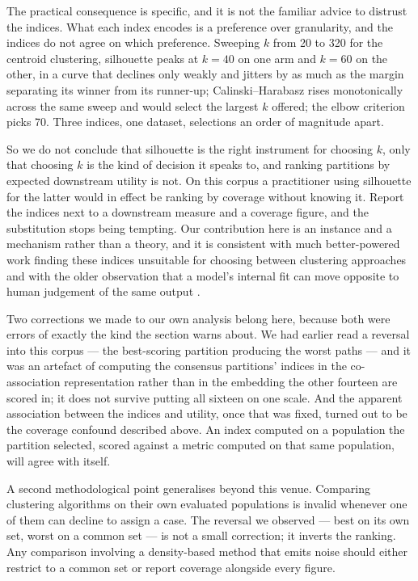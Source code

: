 The practical consequence is specific, and it is not the familiar advice to distrust the
indices. What each index encodes is a preference over granularity, and the indices do not agree
on which preference. Sweeping $k$ from 20 to 320 for the centroid clustering, silhouette peaks
at $k = 40$ on one arm and $k = 60$ on the other, in a curve that declines only weakly and
jitters by as much as the margin separating its winner from its runner-up; Calinski--Harabasz
rises monotonically across the same sweep and would select the largest $k$ offered; the elbow
criterion picks 70. Three indices, one dataset, selections an order of magnitude apart.

So we do not conclude that silhouette is the right instrument for choosing $k$, only that
choosing $k$ is the kind of decision it speaks to, and ranking partitions by expected downstream
utility is not. On this corpus a practitioner using silhouette for the latter would in effect be
ranking by coverage without knowing it. Report the indices next to a downstream measure and a
coverage figure, and the substitution stops being tempting. Our
contribution here is an instance and a mechanism rather than a theory, and it is consistent with
much better-powered work finding these indices unsuitable for choosing between clustering
approaches \citep{yerbury2025rvi} and with the older observation that a model's internal fit can
move opposite to human judgement of the same output \citep{chang2009teahaves}.

Two corrections we made to our own analysis belong here, because both were errors of exactly the
kind the section warns about. We had earlier read a reversal into this corpus --- the
best-scoring partition producing the worst paths --- and it was an artefact of computing the
consensus partitions' indices in the co-association representation rather than in the embedding
the other fourteen are scored in; it does not survive putting all sixteen on one scale. And the
apparent association between the indices and utility, once that was fixed, turned out to be the
coverage confound described above. An index computed on a population the partition selected,
scored against a metric computed on that same population, will agree with itself.

A second methodological point generalises beyond this venue. Comparing clustering algorithms on
their own evaluated populations is invalid whenever one of them can decline to assign a case.
The reversal we observed --- best on its own set, worst on a common set --- is not a small
correction; it inverts the ranking. Any comparison involving a density-based method that emits
noise should either restrict to a common set or report coverage alongside every figure.

